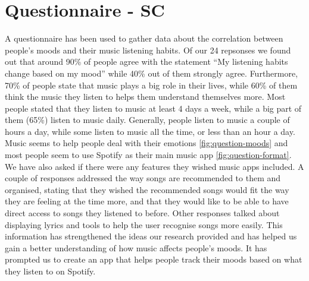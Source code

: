 \documentclass[11pt]{report}
\begin{document}
\section{Questionnaire - SC}
A questionnaire has been used to gather data about the correlation between people’s moods and their music listening habits. Of our 24 repsonses we found out that around 90\% of people agree with the statement “My listening habits change based on my mood” while 40\% out of them strongly agree. Furthermore, 70\% of people state that music plays a big role in their lives, while 60\% of them think the music they listen to helps them understand themselves more. Most people stated that they listen to music at least 4 days a week, while a big part of them (65\%) listen to music daily. Generally, people listen to music a couple of hours a day, while some listen to music all the time, or less than an hour a day. Music seems to help people deal with their emotions \ref{fig:question-moods} and most people seem to use Spotify as their main music app \ref{fig:question-format}. We have also asked if there were any features they wished music apps included. A couple of responses addressed the way songs are recommended to them and organised, stating that they wished the recommended songs would fit the way they are feeling at the time more, and that they would like to be able to have direct access to songs they listened to before. Other responses talked about displaying lyrics and tools to help the user recognise songs more easily. This information has strengthened the ideas our research provided and has helped us gain a better understanding of how music affects people’s moods. It has prompted us to create an app that helps people track their moods based on what they listen to on Spotify.
\end{document}
